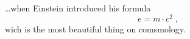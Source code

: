 \documentclass[a4paper,11pt]{article}
\begin{document}
\ldots when Einstein introduced his formula
\begin{equation}
  e = m \cdot c^2 \; ,
\end{equation}
wich is the most beautiful thing on comsmology.
\end{document}
